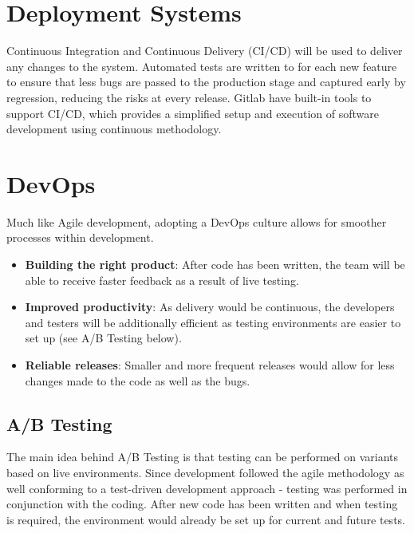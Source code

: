 \documentclass[12pt]{article}
\begin{document}
\section{Deployment Systems}
Continuous Integration and Continuous Delivery (CI/CD) will be used to deliver any changes to the system. Automated tests are written to for each new feature to ensure that less bugs are passed to the production stage and captured early by regression, reducing the risks at every release. Gitlab have built-in tools to support CI/CD, which provides a simplified setup and execution of software development using continuous methodology.

\section{DevOps}
Much like Agile development, adopting a DevOps culture allows for smoother processes within development.
\begin{itemize}
    \item \textbf{Building the right product}: After code has been written, the team will be able to receive faster feedback as a result of live testing.
    \item \textbf{Improved productivity}: As delivery would be continuous, the developers and testers will be additionally efficient as testing environments are easier to set up (see A/B Testing below).
    \item \textbf{Reliable releases}: Smaller and more frequent releases would allow for less changes made to the code as well as the bugs.
\end{itemize}

\subsection{A/B Testing}
The main idea behind A/B Testing is that testing can be performed on variants based on live environments. Since development followed the agile methodology as well conforming to a test-driven development approach - testing was performed in conjunction with the coding. After new code has been written and when testing is required, the environment would already be set up for current and future tests.
\end{document}
